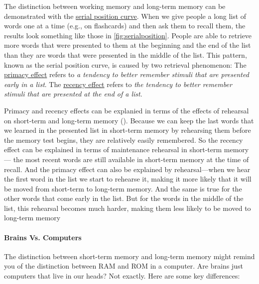 \documentclass[
]{krantz}
\begin{document}
The distinction between working memory and long-term memory can be demonstrated with the \hyperref[serial-position-curve]{serial position curve}. When we give people a long list of words one at a time (e.g., on flashcards) and then ask them to recall them, the results look something like those in \ref{fig:serialposition}. People are able to retrieve more words that were presented to them at the beginning and the end of the list than they are words that were presented in the middle of the list. This pattern, known as the serial position curve, is caused by two retrieval phenomenon: The \hyperref[primacy-effect]{primacy effect} refers to \emph{a tendency to better remember stimuli that are presented early in a list}. The \hyperref[recency-effect]{recency effect} refers to \emph{the tendency to better remember stimuli that are presented at the end of a list}.

Primacy and recency effects can be explanied in terms of the effects of rehearsal on short-term and long-term memory (). Because we can keep the last words that we learned in the presented list in short-term memory by rehearsing them before the memory test begins, they are relatively easily remembered. So the recency effect can be explained in terms of maintenance rehearsal in short-term memory--- the most recent words are still available in short-term memory at the time of recall. And the primacy effect can also be explained by rehearsal---when we hear the first word in the list we start to rehearse it, making it more likely that it will be moved from short-term to long-term memory. And the same is true for the other words that come early in the list. But for the words in the middle of the list, this rehearsal becomes much harder, making them less likely to be moved to long-term memory

\paragraph*{Brains Vs. Computers}\label{brains-vs.-computers}

The distinction between short-term memory and long-term memory might remind you of the distinction between RAM and ROM in a computer. Are brains just computers that live in our heads? Not exactly. Here are some key differences:
\end{document}
